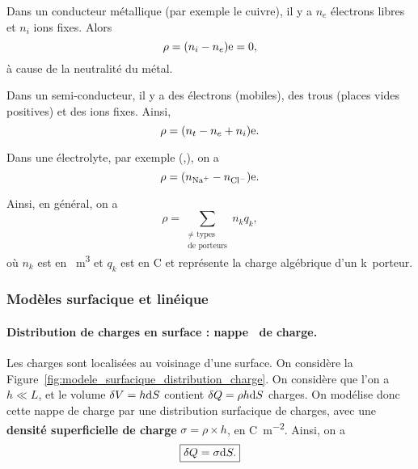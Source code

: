             \begin{example}
                Dans un conducteur métallique (par exemple le cuivre), il y a $n_e$ électrons libres et $n_i$ ions fixes. Alors 
                \begin{equation}
                    \rho=(n_i-n_e)\mathrm{e}=0,
                \end{equation}
                à cause de la neutralité du métal.
            \end{example}
            \begin{example}
                Dans un semi-conducteur, il y a des électrons (mobiles), des trous (places vides positives) et des ions fixes. Ainsi,
                \begin{equation}
                    \rho=(n_t-n_e+n_i)\mathrm{e}.
                \end{equation}
            \end{example}
            \begin{example}
                Dans une électrolyte, par exemple (,), on a 
                \begin{equation}
                    \rho=(n_{\ce{Na+}}-n_{\ce{Cl-}})\rme.
                \end{equation}
            \end{example}

            Ainsi, en général, on a
            \begin{equation}
                \rho=\sum_{\substack{\neq\text{ types}\\\text{de porteurs}}}n_{k}q_{k},
            \end{equation}
            où $n_k$ est en \si{\per\metre\cubed} et $q_k$ est en \si{\coulomb} et représente la charge algébrique d'un \og k\fg~porteur.

        \subsubsection{Modèles surfacique et linéique}

            \paragraph{Distribution de charges en surface : \og nappe\fg~ de charge.}

                Les charges sont localisées au voisinage d'une surface. On considère la Figure~\ref{fig:modele_surfacique_distribution_charge}. On considère que l'on a $h\ll L$, et le volume $\delta V=h\mathrm{d} S$ contient $\delta Q=\rho h\mathrm{d} S$ charges. On modélise donc cette nappe de charge par une distribution surfacique de charges, avec une \textbf{densité superficielle de charge} $\sigma=\rho\times h$, en \si{\coulomb\per\metre\squared}. Ainsi, on a 
                \begin{equation}
                    \boxed{
                        \delta Q=\sigma\mathrm{d} S.
                    }
                \end{equation}

